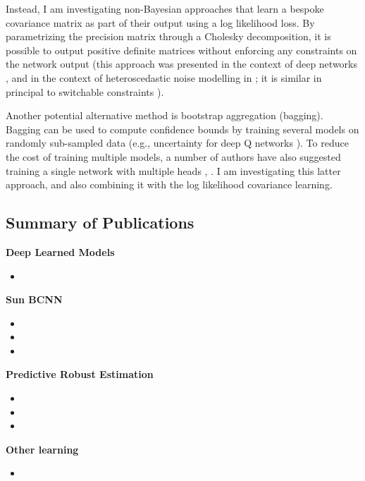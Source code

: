  Instead, I am investigating non-Bayesian approaches that learn a bespoke covariance matrix as part of their output using a log likelihood loss. By parametrizing the precision matrix through a Cholesky decomposition, it is possible to output positive definite matrices without enforcing any constraints on the network output (this approach was presented in the context of deep networks \citep{Haarnoja2016-ph}, and in the context of heteroscedastic noise modelling in \citep{Hu2015-uw}; it is similar in principal to switchable constraints \citep{Agarwal2013-jq}).
 
 Another potential alternative method is bootstrap aggregation (bagging). Bagging can be used to compute confidence bounds by training several models on randomly sub-sampled data (e.g., uncertainty for deep Q networks \citep{Osband2016-jg}). To reduce the cost of training multiple models, a number of authors have also suggested training a single network with multiple heads \citep{Lee2015-af}, \citep{Lakshminarayanan2016-zh}. I am investigating this latter approach, and also combining it with the log likelihood covariance learning.

\subsection{Summary of Publications}
\textbf{Deep Learned Models}
\begin{itemize}
	\item {}
\end{itemize}

\noindent\textbf{Sun BCNN}

\begin{itemize}
	\item {}
	\item {}
	\item {}
\end{itemize}

\noindent\textbf{Predictive Robust Estimation}

\begin{itemize}
	\item {}
	\item {}
	\item {}
\end{itemize}

\noindent\textbf{Other learning}

\begin{itemize}
	\item {}
\end{itemize}

